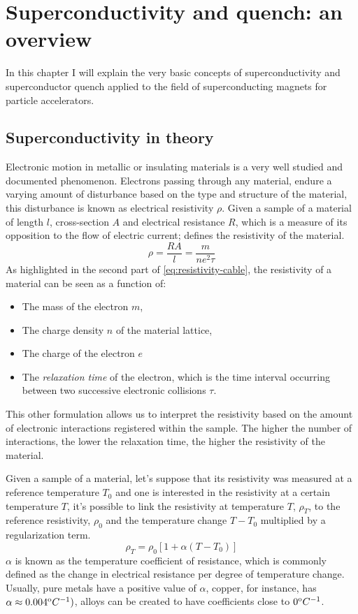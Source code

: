 \chapter{Superconductivity and quench: an overview}
\label{chp:soupcond-quench}
In this chapter I will explain the very basic concepts of superconductivity and
superconductor quench applied to the field of superconducting magnets for particle accelerators.
\section{Superconductivity in theory}
\label{sec:soupcond}
Electronic motion in metallic or insulating materials is a very well studied and documented
phenomenon. Electrons passing through any material, endure a varying amount of disturbance based on
the type and structure of the material, this disturbance is known as electrical resistivity $\rho$. Given a
sample of a material of length $l$, cross-section $A$ and electrical resistance $R$, which is a
measure of its opposition to the flow of electric current;  defines the
resistivity of the material.
\begin{equation}
	\label{eq:resistivity-cable}
	\rho = \frac{RA}{l} = \frac{m}{ne^2\tau}
\end{equation}
As highlighted in the second part of \cref{eq:resistivity-cable}, the resistivity of a
material can be seen as a function of:
\begin{itemize}
	\item The mass of the electron $m$,
	\item The charge density $n$ of the material lattice,
	\item The charge of the electron $e$
	\item The \emph{relaxation time} of the electron, which is the time interval occurring between two
	      successive electronic collisions $\tau$.
\end{itemize}
This other formulation allows us to interpret the resistivity based on the amount of electronic
interactions registered within the sample. The higher the number of interactions, the lower the
relaxation time, the higher the resistivity of the material.

\medskip

Given a sample of a material, let's suppose that its resistivity was measured at a reference
temperature $T_0$ and one is interested in the resistivity at a certain temperature $T$, it's
possible to link the resistivity at temperature $T$, $\rho_T$, to the reference resistivity,
$\rho_0$ and the temperature change $T - T_0$ multiplied by a regularization term.
\begin{equation}
	\label{eq:resistivity-func-of-temp}
	\rho_T = \rho_0[1 + \alpha(T - T_0)]
\end{equation}
$\alpha$ is known as the temperature coefficient of resistance, which is commonly defined as the
change in electrical resistance per degree of temperature change. Usually, pure metals have a
positive value of $\alpha$, copper, for instance, has $\alpha \approx 0.004^\text{o}C^{-1})$, alloys can be created to have coefficients close to $0^\text{o}C^{-1}$.

